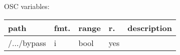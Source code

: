 \begin{snugshade}
{\footnotesize
\label{osctab:tascarapallpass}
OSC variables:
\nopagebreak

\begin{tabularx}{\textwidth}{llllX}
\hline
path & fmt. & range & r. & description\\
\hline
/.../bypass & i & bool & yes & \\
\hline
\end{tabularx}
}
\end{snugshade}
